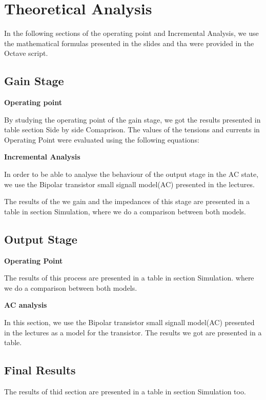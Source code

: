 \section{Theoretical Analysis}
\label{sec:analysis}

In the following sections of the operating point and Incremental Analysis, we use the mathematical formulas presented in the slides
and tha were provided in the Octave script.

\subsection{Gain Stage}


\textbf{Operating point}

By studying the operating point of the gain stage, we got the results presented in table section Side by side Comaprison.
The values of the tensions and currents in Operating Point were evaluated using the following equations:


\textbf{Incremental Analysis}

In order to be able to analyse the behaviour of the output stage in the AC state, we use the Bipolar transistor small signall model(AC) presented in the lectures.

The results of the we gain and the impedances of this stage are presented in a table in section Simulation, where we do a comparison between both models.



\subsection{Output Stage}

\textbf{Operating Point}

The results of this process are presented in a table in section Simulation. where we do a comparison between both models.

\textbf{AC analysis}

In this section, we use the Bipolar transistor small signall model(AC) presented in the lectures as a model for the transistor.
The results we got are presented in a table.

\subsection{Final Results}

The results of thid section are presented in a table in section Simulation too.

